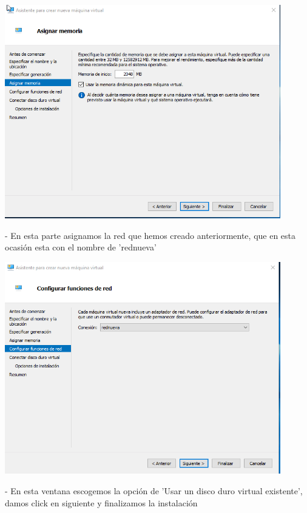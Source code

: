 \documentclass[12pt,letterpaper]{article}
\begin{document}
\begin{center}
	\includegraphics[width=12cm]{./Imagenes/9} 
\end{center}


\begin{itemize}
- En esta parte asignamos la red que hemos creado anteriormente, que en esta ocasión esta con el nombre de 'rednueva'\\
\end{itemize}

\begin{center}
	\includegraphics[width=12cm]{./Imagenes/10} 
\end{center}

\begin{itemize}
- En esta ventana escogemos la opción de 'Usar un disco
duro virtual existente', damos click en siguiente y finalizamos la instalación\\
\end{itemize}
\end{document}
